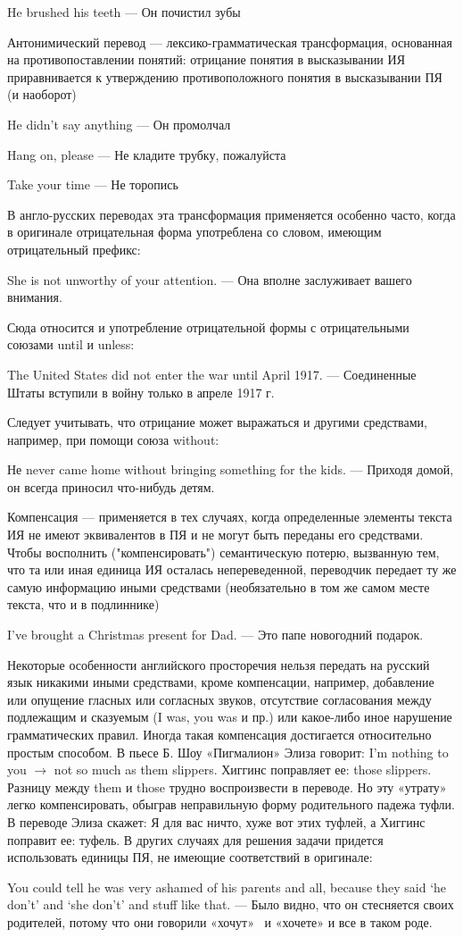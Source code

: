 He brushed his teeth --- Он почистил зубы

Антонимический перевод --- лексико-грамматическая трансформация, основанная на противопоставлении понятий: отрицание понятия в высказывании ИЯ приравнивается к утверждению противоположного понятия в высказывании ПЯ (и наоборот)

He didn’t say anything --- Он промолчал

Hang on, please --- Не кладите трубку, пожалуйста 

Take your time --- Не торопись

В англо-русских переводах эта трансформация применяется особенно часто, когда в оригинале отрицательная форма употреблена со словом, имеющим отрицательный префикс:

She is not unworthy of your attention. ---  Она вполне заслуживает вашего внимания.

Сюда относится и употребление отрицательной формы с отрицательными союзами until и unless:

The United States did not enter the war until April 1917. --- Соединенные Штаты вступили в войну только в апреле 1917 г.

Следует учитывать, что отрицание может выражаться и другими средствами, например, при помощи союза without:

Не never came home without bringing something for the kids. ---  Приходя домой, он всегда приносил что-нибудь детям.

Компенсация --- применяется в тех случаях, когда определенные элементы текста ИЯ не имеют эквивалентов в ПЯ и не могут быть переданы его средствами. Чтобы восполнить ("компенсировать") семантическую потерю, вызванную тем, что та или иная единица ИЯ осталась непереведенной, переводчик передает ту же самую информацию иными средствами (необязательно в том же самом месте текста, что и в подлиннике)

I’ve brought a Christmas present for Dad. --- Это папе новогодний подарок.

Некоторые особенности английского просторечия нельзя передать на русский язык никакими иными средствами, кроме компенсации, например, добавление или опущение гласных или согласных звуков, отсутствие согласования между подлежащим и сказуемым (I was, you was и пр.) или какое-либо иное нарушение грамматических правил. Иногда такая компенсация достигается относительно простым способом. В пьесе Б. Шоу «Пигмалион» Элиза говорит: I’m nothing to you $\rightarrow $ not so much as them slippers. Хиггинс поправляет ее: those slippers. Разницу между them и those трудно воспроизвести в переводе. Но эту «утрату» легко компенсировать, обыграв неправильную форму родительного падежа туфли. В переводе Элиза скажет: Я для вас ничто, хуже вот этих туфлей, а Хиггинс поправит ее: туфель. В других случаях для решения задачи придется использовать единицы ПЯ, не имеющие соответствий в оригинале:

You could tell he was very ashamed of his parents and all, because they said ‘he don’t’ and ‘she don’t’ and stuff like that. --- Было видно, что он стесняется своих родителей, потому что они говорили «хочут»  и «хочете» и все в таком роде.
